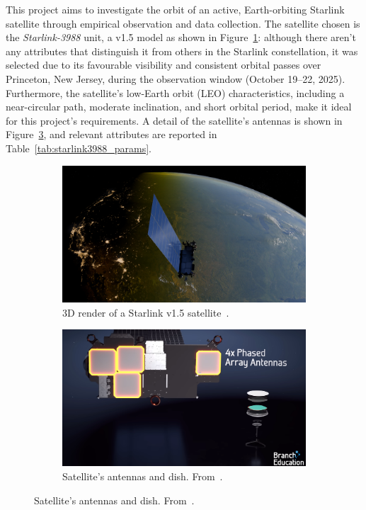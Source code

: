 \documentclass{article}
\begin{document}
This project aims to investigate the orbit of an active, Earth-orbiting Starlink satellite through empirical observation and data collection. The satellite chosen is the \textit{Starlink-3988} unit, a v1.5 model as shown in Figure~\ref{fig:satellite_render}: although there aren't any attributes that distinguish it from others in the Starlink constellation, it was selected due to its favourable visibility and consistent orbital passes over Princeton, New Jersey, during the observation window (October 19–22, 2025). Furthermore, the satellite’s low-Earth orbit (LEO) characteristics, including a near-circular path, moderate inclination, and short orbital period, make it ideal for this project's requirements. A detail of the satellite's antennas is shown in Figure~\ref{fig:satellite_antennas}, and relevant attributes are reported in Table~\ref{tab:starlink3988_params}.

\begin{figure}[h!]
    \centering
    
    \begin{subfigure}[b]{0.49\textwidth}
        \centering
        \includegraphics[width=\textwidth]{LaTeX/Figures/satellite_render.png}
        \caption{3D render of a Starlink v1.5 satellite~\cite{wikimedia_starlink_01_2025}.}
        \label{fig:satellite_render}
    \end{subfigure}\hfill
    \begin{subfigure}[b]{0.49\textwidth}
        \centering
        \includegraphics[width=\textwidth]{LaTeX/Figures/satellite_antennas.png}
        \caption{Satellite's antennas and dish. From~\cite{branch_education_starlink_2022}.}
        \label{fig:satellite_antennas}
    \end{subfigure}
    
\end{figure}
\end{document}
